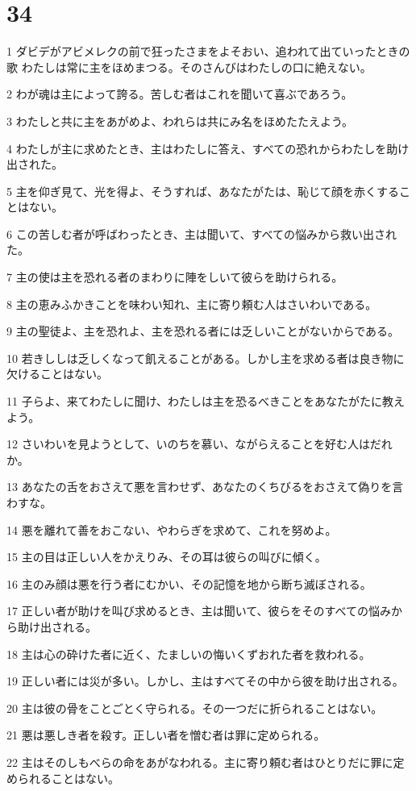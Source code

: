 \chapter{34}

\par 1 ダビデがアビメレクの前で狂ったさまをよそおい、追われて出ていったときの歌 わたしは常に主をほめまつる。そのさんびはわたしの口に絶えない。
\par 2 わが魂は主によって誇る。苦しむ者はこれを聞いて喜ぶであろう。
\par 3 わたしと共に主をあがめよ、われらは共にみ名をほめたたえよう。
\par 4 わたしが主に求めたとき、主はわたしに答え、すべての恐れからわたしを助け出された。
\par 5 主を仰ぎ見て、光を得よ、そうすれば、あなたがたは、恥じて顔を赤くすることはない。
\par 6 この苦しむ者が呼ばわったとき、主は聞いて、すべての悩みから救い出された。
\par 7 主の使は主を恐れる者のまわりに陣をしいて彼らを助けられる。
\par 8 主の恵みふかきことを味わい知れ、主に寄り頼む人はさいわいである。
\par 9 主の聖徒よ、主を恐れよ、主を恐れる者には乏しいことがないからである。
\par 10 若きししは乏しくなって飢えることがある。しかし主を求める者は良き物に欠けることはない。
\par 11 子らよ、来てわたしに聞け、わたしは主を恐るべきことをあなたがたに教えよう。
\par 12 さいわいを見ようとして、いのちを慕い、ながらえることを好む人はだれか。
\par 13 あなたの舌をおさえて悪を言わせず、あなたのくちびるをおさえて偽りを言わすな。
\par 14 悪を離れて善をおこない、やわらぎを求めて、これを努めよ。
\par 15 主の目は正しい人をかえりみ、その耳は彼らの叫びに傾く。
\par 16 主のみ顔は悪を行う者にむかい、その記憶を地から断ち滅ぼされる。
\par 17 正しい者が助けを叫び求めるとき、主は聞いて、彼らをそのすべての悩みから助け出される。
\par 18 主は心の砕けた者に近く、たましいの悔いくずおれた者を救われる。
\par 19 正しい者には災が多い。しかし、主はすべてその中から彼を助け出される。
\par 20 主は彼の骨をことごとく守られる。その一つだに折られることはない。
\par 21 悪は悪しき者を殺す。正しい者を憎む者は罪に定められる。
\par 22 主はそのしもべらの命をあがなわれる。主に寄り頼む者はひとりだに罪に定められることはない。


